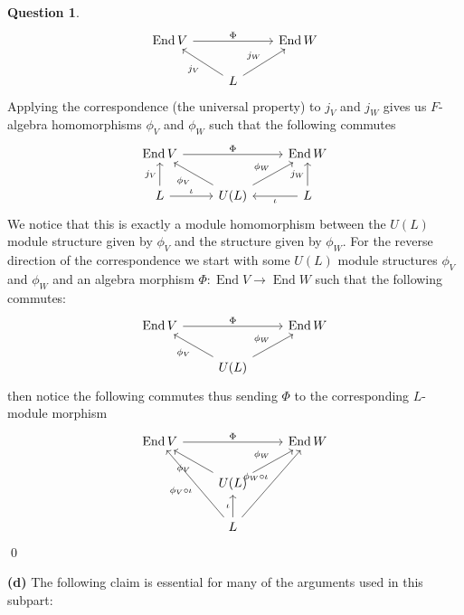 \documentclass[10.5pt]{article}
\theoremstyle{definition}
\newtheorem{pb}{Question}
\numberwithin{example}{subsection}
\numberwithin{proposition}{subsection}
\begin{document}
\begin{pb}
        \begin{equation}\begin{tikzcd}
            \operatorname{End}V \arrow[rr,"\Phi"] &&\operatorname{End}W \\
            &L \arrow[ul,"j_V"] \arrow[ur,"j_W"]
        \end{tikzcd}\end{equation}
        Applying the correspondence (the universal property) to \(j_V\) and \(j_W\) gives us \(F\)-algebra homomorphisms \(\phi_V\) and \(\phi_W\) such that the following commutes
        \begin{equation}\begin{tikzcd}
            \operatorname{End}V \arrow[rr,"\Phi"] &&\operatorname{End}W \\
            L \arrow[r,"\iota"] \arrow[u,"j_V"]&U(L) \arrow[ul,"\phi_V"] \arrow[ur,"\phi_W"] & L \arrow[u,"j_W"] \arrow[l,"\iota"]
        \end{tikzcd}\end{equation}
        We notice that this is exactly a module homomorphism between the \(U(L)\) module structure given by \(\phi_V\) and the structure given by \(\phi_W\). For the reverse direction of the correspondence we start with some \(U(L)\) module structures \(\phi_V\) and \(\phi_W\) and an algebra morphism \(\Phi: \operatorname{End}V \to \operatorname{End}W\) such that the following commutes:
        \begin{equation}\begin{tikzcd}
            \operatorname{End}V \arrow[rr,"\Phi"] &&\operatorname{End}W \\
            &U(L) \arrow[ul,"\phi_V"] \arrow[ur,"\phi_W"]
        \end{tikzcd}\end{equation}
        then notice the following commutes thus sending \(\Phi\) to the corresponding \(L\)-module morphism
        \begin{equation}\begin{tikzcd}
            \operatorname{End}V \arrow[rr,"\Phi"] &&\operatorname{End}W \\
            &U(L) \arrow[ul,"\phi_V"] \arrow[ur,"\phi_W"] \\
            &L \arrow[u,"\iota"] \arrow[uul,"\phi_V \circ\iota"] \arrow[uur,"\phi_W\circ\iota"]
        \end{tikzcd}\end{equation}
        \qed

        \textbf{(d)} The following claim is essential for many of the arguments used in this subpart:


\end{pb}
\end{document}
